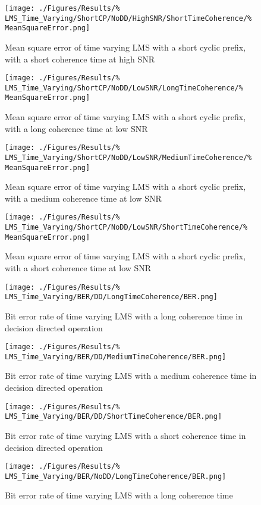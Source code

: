 \begin{figure}[ht]
	\texttt{[image: ./Figures/Results/\%
LMS\_Time\_Varying/ShortCP/NoDD/HighSNR/ShortTimeCoherence/\%
MeanSquareError.png]}
	\caption{Mean square error of time varying LMS with a 
	short cyclic prefix, with a short coherence time at high SNR}
\end{figure}
\begin{figure}[ht]
	\texttt{[image: ./Figures/Results/\%
LMS\_Time\_Varying/ShortCP/NoDD/LowSNR/LongTimeCoherence/\%
MeanSquareError.png]}
	\caption{Mean square error of time varying LMS with a 
	short cyclic prefix, with a long coherence time at low SNR}
\end{figure}
\begin{figure}[ht]
	\texttt{[image: ./Figures/Results/\%
LMS\_Time\_Varying/ShortCP/NoDD/LowSNR/MediumTimeCoherence/\%
MeanSquareError.png]}
	\caption{Mean square error of time varying LMS with a 
	short cyclic prefix, with a medium coherence time at low SNR}
\end{figure}
\begin{figure}[ht]
	\texttt{[image: ./Figures/Results/\%
LMS\_Time\_Varying/ShortCP/NoDD/LowSNR/ShortTimeCoherence/\%
MeanSquareError.png]}
	\caption{Mean square error of time varying LMS with a 
	short cyclic prefix, with a short coherence time at low SNR}
\end{figure}
\begin{figure}[ht]
	\texttt{[image: ./Figures/Results/\%
LMS\_Time\_Varying/BER/DD/LongTimeCoherence/BER.png]}
	\caption{Bit error rate of time varying LMS with a long coherence time 
	in decision directed operation}
\end{figure}
\begin{figure}[ht]
	\texttt{[image: ./Figures/Results/\%
LMS\_Time\_Varying/BER/DD/MediumTimeCoherence/BER.png]}
	\caption{Bit error rate of time varying LMS with a medium coherence time 
	in decision directed operation}
\end{figure}
\begin{figure}[ht]
	\texttt{[image: ./Figures/Results/\%
LMS\_Time\_Varying/BER/DD/ShortTimeCoherence/BER.png]}
	\caption{Bit error rate of time varying LMS with a short coherence time 
	in decision directed operation}
\end{figure}
\begin{figure}[ht]
	\texttt{[image: ./Figures/Results/\%
LMS\_Time\_Varying/BER/NoDD/LongTimeCoherence/BER.png]}
	\caption{Bit error rate of time varying LMS with a long coherence time}
\end{figure}
